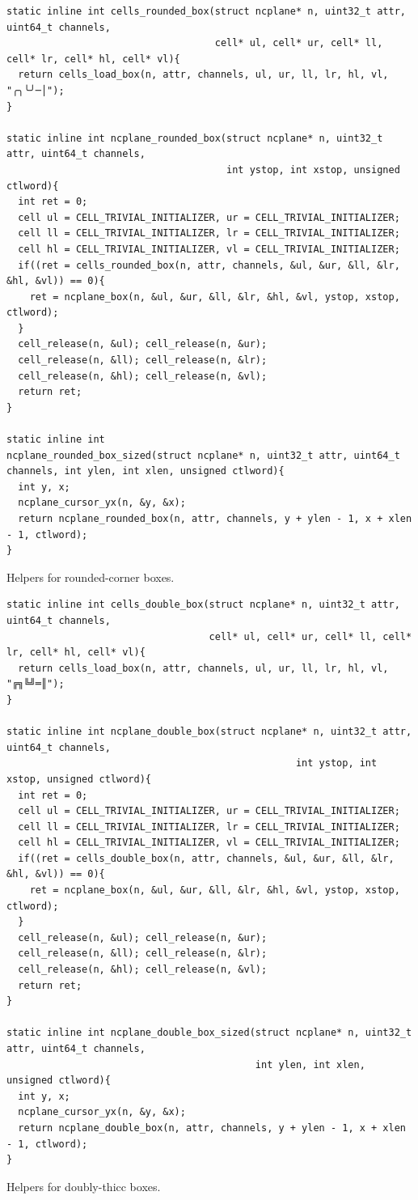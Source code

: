 \documentclass[letterpaper,10pt]{article}
\begin{document}
\begin{listing}[!htb]
\begin{verbatim}
static inline int cells_rounded_box(struct ncplane* n, uint32_t attr, uint64_t channels,
                                    cell* ul, cell* ur, cell* ll, cell* lr, cell* hl, cell* vl){
  return cells_load_box(n, attr, channels, ul, ur, ll, lr, hl, vl, "╭╮╰╯─│");
}

static inline int ncplane_rounded_box(struct ncplane* n, uint32_t attr, uint64_t channels,
                                      int ystop, int xstop, unsigned ctlword){
  int ret = 0;
  cell ul = CELL_TRIVIAL_INITIALIZER, ur = CELL_TRIVIAL_INITIALIZER;
  cell ll = CELL_TRIVIAL_INITIALIZER, lr = CELL_TRIVIAL_INITIALIZER;
  cell hl = CELL_TRIVIAL_INITIALIZER, vl = CELL_TRIVIAL_INITIALIZER;
  if((ret = cells_rounded_box(n, attr, channels, &ul, &ur, &ll, &lr, &hl, &vl)) == 0){
    ret = ncplane_box(n, &ul, &ur, &ll, &lr, &hl, &vl, ystop, xstop, ctlword);
  }
  cell_release(n, &ul); cell_release(n, &ur);
  cell_release(n, &ll); cell_release(n, &lr);
  cell_release(n, &hl); cell_release(n, &vl);
  return ret;
}

static inline int
ncplane_rounded_box_sized(struct ncplane* n, uint32_t attr, uint64_t channels, int ylen, int xlen, unsigned ctlword){
  int y, x;
  ncplane_cursor_yx(n, &y, &x);
  return ncplane_rounded_box(n, attr, channels, y + ylen - 1, x + xlen - 1, ctlword);
}
\end{verbatim}
\caption{Helpers for rounded-corner boxes.}
\label{list:roundboxes}
\end{listing}

\begin{listing}[!htb]
\begin{verbatim}
static inline int cells_double_box(struct ncplane* n, uint32_t attr, uint64_t channels,
                                   cell* ul, cell* ur, cell* ll, cell* lr, cell* hl, cell* vl){
  return cells_load_box(n, attr, channels, ul, ur, ll, lr, hl, vl, "╔╗╚╝═║");
}

static inline int ncplane_double_box(struct ncplane* n, uint32_t attr, uint64_t channels,
                                                  int ystop, int xstop, unsigned ctlword){
  int ret = 0;
  cell ul = CELL_TRIVIAL_INITIALIZER, ur = CELL_TRIVIAL_INITIALIZER;
  cell ll = CELL_TRIVIAL_INITIALIZER, lr = CELL_TRIVIAL_INITIALIZER;
  cell hl = CELL_TRIVIAL_INITIALIZER, vl = CELL_TRIVIAL_INITIALIZER;
  if((ret = cells_double_box(n, attr, channels, &ul, &ur, &ll, &lr, &hl, &vl)) == 0){
    ret = ncplane_box(n, &ul, &ur, &ll, &lr, &hl, &vl, ystop, xstop, ctlword);
  }
  cell_release(n, &ul); cell_release(n, &ur);
  cell_release(n, &ll); cell_release(n, &lr);
  cell_release(n, &hl); cell_release(n, &vl);
  return ret;
}

static inline int ncplane_double_box_sized(struct ncplane* n, uint32_t attr, uint64_t channels,
                                           int ylen, int xlen, unsigned ctlword){
  int y, x;
  ncplane_cursor_yx(n, &y, &x);
  return ncplane_double_box(n, attr, channels, y + ylen - 1, x + xlen - 1, ctlword);
}
\end{verbatim}
\caption{Helpers for doubly-thicc boxes.}
\label{list:doubleboxes}
\end{listing}
\end{document}
